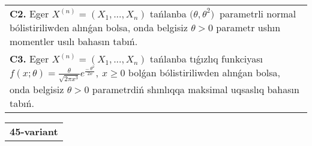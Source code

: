 \documentclass{article}
\begin{document}
\begin{tabular}{m{17cm}}
 \\
\textbf{C2.} 
Eger \(X^{(n)} = \left( X_{1},...,X_{n} \right)\) tańlanba \({(\theta,\theta}^{2})\ \) parametrli normal bólistiriliwden alınǵan bolsa, onda belgisiz \(\theta > 0\) parametr ushın momentler usılı bahasın tabıń.
 \\
\textbf{C3.} 
Eger \(X^{(n)} = \left( X_{1},...,X_{n} \right)\) tańlanba tıǵızlıq funkciyası
$f(x;\theta) = \frac{\theta}{\sqrt{2\pi x^{3}}}e^{\frac{- \ \theta^{2}}{2x}},\ x \geq 0$
bolǵan bólistiriliwden alınǵan bolsa, onda belgisiz \(\theta > 0\) parametrdiń shınlıqqa maksimal uqsaslıq bahasın tabıń.
 \\

\end{tabular}
\vspace{1cm}


\begin{tabular}{m{17cm}}
\textbf{45-variant}
\newline


\end{tabular}
\end{document}
